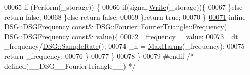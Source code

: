 \begin{DoxyCode}
00065                 \textcolor{keywordflow}{if} (Perform(\_storage)) \{
00066                     \textcolor{keywordflow}{if}(signal.\hyperlink{class_d_s_g_1_1_ring_buffer_aa5dd2caa0a270173251faee40a43d692}{Write}(\_storage))\{
00067                     \}\textcolor{keywordflow}{else} \textcolor{keywordflow}{return} \textcolor{keyword}{false};
00068                 \}\textcolor{keywordflow}{else} \textcolor{keywordflow}{return} \textcolor{keyword}{false};
00069             \}\textcolor{keywordflow}{return} \textcolor{keyword}{true};
00070         \}
\hypertarget{_fourier_triangle_8h_source_l00071}{}\hyperlink{class_d_s_g_1_1_fourier_1_1_fourier_triangle_a278a51ed8af32ea371adc903b9b25039}{00071}         \textcolor{keyword}{inline} \hyperlink{namespace_d_s_g_a4315a061386fa1014fda09b15d3a6973}{DSG::DSGFrequency} \textcolor{keyword}{const}& 
      \hyperlink{class_d_s_g_1_1_signal_generator_a4e6b3c43e76e53f8cd337ad699c464cb}{DSG::Fourier::FourierTriangle::Frequency}(
      \hyperlink{namespace_d_s_g_a4315a061386fa1014fda09b15d3a6973}{DSG::DSGFrequency} \textcolor{keyword}{const}& value)\{
00072             \_frequency = value;
00073             \_dt = \_frequency/\hyperlink{namespace_d_s_g_a72df05177db0412c3590070923f62819}{DSG::SampleRate}();
00074             \_h = \hyperlink{namespace_d_s_g_ab5c4eea42ea10b69cfc32afb83ff1d0d}{MaxHarms}(\_frequency);
00075             \textcolor{keywordflow}{return} \_frequency;
00076         \}
00077     \}
00078 \}
00079 \textcolor{preprocessor}{#endif }\textcolor{comment}{/* defined(\_\_DSG\_\_FourierTriangle\_\_) */}\textcolor{preprocessor}{}
\end{DoxyCode}
